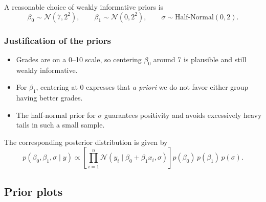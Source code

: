 \documentclass[
  english,
  12pt,
]{article}
\providecommand{\tightlist}{%
  \setlength{\itemsep}{0pt}\setlength{\parskip}{0pt}}
\begin{document}
A reasonable choice of weakly informative priors is \[
\beta_0 \sim \mathcal N(7, 2^2), \qquad
\beta_1 \sim \mathcal N(0, 2^2), \qquad
\sigma \sim \text{Half-Normal}(0, 2).
\]

\subsubsection{Justification of the
priors}\label{justification-of-the-priors}

\begin{itemize}
\tightlist
\item
  Grades are on a 0--10 scale, so centering \(\beta_0\) around 7 is
  plausible and still weakly informative.
\item
  For \(\beta_1\), centering at 0 expresses that \emph{a priori} we do
  not favor either group having better grades.
\item
  The half-normal prior for \(\sigma\) guarantees positivity and avoids
  excessively heavy tails in such a small sample.
\end{itemize}

The corresponding posterior distribution is given by \[
p(\beta_0, \beta_1, \sigma \mid y)
\propto
\left[\prod_{i=1}^n \mathcal{N}(y_i \mid \beta_0 + \beta_1 x_i, \sigma)\right]
p(\beta_0)\, p(\beta_1)\, p(\sigma).
\]

\subsection{Prior plots}\label{prior-plots}
\end{document}
